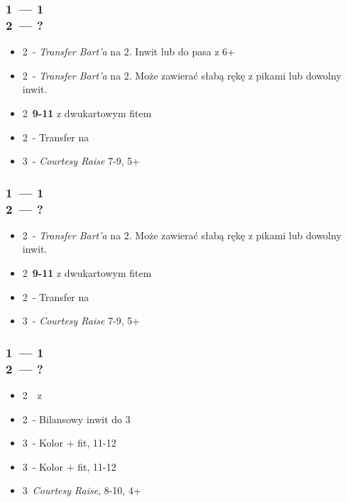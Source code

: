 \documentclass[12pt, a4paper]{article}
\begin{document}
    \subsubsection{1\spades\ --- 1\ntx \\ 2\clubs\ --- ?}
    \begin{itemize}
        \item 2\diams\ - \emph{Transfer Bart'a} na 2\hearts.
        Inwit lub do pasa z 6+\hearts
        \item 2\hearts\ - \emph{Transfer Bart'a} na 2\spades.
        Może zawierać słabą rękę z pikami lub dowolny inwit.
        \item 2\spades\ \textbf{9-11} z dwukartowym fitem
        \item 2\nt\ - Transfer na \diams
        \item 3\clubs\ - \emph{Courtesy Raise} 7-9, 5+\clubs
    \end{itemize}

    \subsubsection{1\spades\ --- 1\ntx \\ 2\diams\ --- ?}
    \begin{itemize}
        \item 2\hearts\ - \emph{Transfer Bart'a} na 2\spades.
        Może zawierać słabą rękę z pikami lub dowolny inwit.
        \item 2\spades\ \textbf{9-11} z dwukartowym fitem
        \item 2\nt\ - Transfer na \clubs
        \item 3\diams\ - \emph{Courtesy Raise} 7-9, 5+\diams
    \end{itemize}

    \subsubsection{1\spades\ --- 1\ntx \\ 2\hearts\ --- ?}
    \begin{itemize}
        \item 2\spades\ \soff\ z \spades
        \item 2\nt\ - Bilansowy inwit do 3\nt
        \item 3\clubs\ - Kolor + fit, 11-12
        \item 3\diams\ - Kolor + fit, 11-12
        \item 3\hearts\ \emph{Courtesy Raise}, 8-10, 4+\hearts
    \end{itemize}
\end{document}

